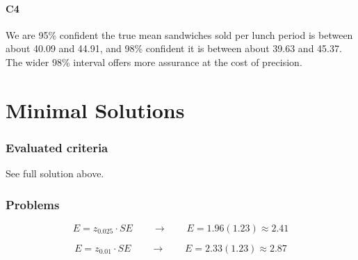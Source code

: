 \begin{ExamProblems}
		\subsection*{C4}
		We are 95\% confident the true mean sandwiches sold per lunch period is between about 40.09 and 44.91, and 98\% confident it is between about 39.63 and 45.37. The wider 98\% interval offers more assurance at the cost of precision.
	\end{ExamProblems}


\part{Minimal Solutions}

\section*{Evaluated criteria}
See full solution above.

\section*{Problems}
\[E = z_{0.025} \cdot SE \qquad \longrightarrow \qquad E = 1.96(1.23) \approx 2.41\]

\[E = z_{0.01} \cdot SE \qquad \longrightarrow \qquad E = 2.33(1.23) \approx 2.87\]


